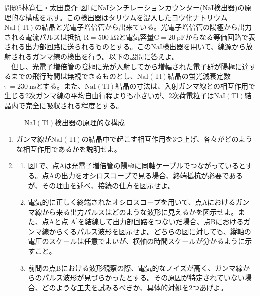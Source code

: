 \documentclass[fleqn]{jbook}
\begin{document}
\begin{question}{問題5}{林寛仁・太田良介}
図1に$\mathrm{NaI}$シンチレーションカウンター($\mathrm{NaI}$検出器)の原理的な構成を示す。この検出器はタリウムを混入したヨウ化ナトリウム$\mathrm{NaI(Tl)}$の結晶と光電子増倍管から出来ている。光電子増倍管の陽極から出力される電流パルスは抵抗
$\mathrm{R}=500 \ \mathrm{k\Omega}$と電気容量$\mathrm{C}=20 \ \mathrm{pF}$からなる等価回路で表される出力部回路に送られるものとする。この$\mathrm{NaI}$検出器を用いて、線源から放射されるガンマ線の検出を行う。以下の設問に答えよ。\\
　但し、光電子増倍管の陰極に光が入射してから増幅された電子群が陽極に達するまでの飛行時間は無視できるものとし、$\mathrm{NaI(Tl)}$結晶の蛍光減衰定数
$\mathrm{\tau}=230 \ \mathrm{ns}$とする。また、$\mathrm{NaI(Tl)}$結晶の寸法は、入射ガンマ線との相互作用で生じる2次ガンマ線の平均自由行程よりも小さいが、2次荷電粒子は$\mathrm{NaI(Tl)}$結晶内で完全に吸収される程度とする。
\begin{figure}[h]
  \begin{center}
    \caption{$\mathrm{NaI(Tl)}$検出器の原理的な構成}
  \end{center}
\end{figure}
\begin{enumerate}
\item ガンマ線が$\mathrm{NaI(Tl)}$の結晶中で起こす相互作用を3つ上げ、各々がどのような相互作用であるかを説明せよ。

\item 
\begin{enumerate}
	\item 図1で、点Aは光電子増倍管の陽極に同軸ケーブルでつながっているとする。点Aの出力をオシロスコープで見る場合、終端抵抗が必要であるが、その理由を述べ、接続の仕方を図示せよ。
	\item 電気的に正しく終端されたオシロスコープを用いて、点Aにおけるガンマ線から来る出力パルスはどのような波形に見えるかを図示せよ。また、点Aと点
	$\mathrm{A}^\prime$を結線して出力部回路をつないだ場合、点Bにおけるガンマ線からくるパルス波形を図示せよ。どちらの図に対しても、縦軸の電圧のスケールは任意でよいが、横軸の時間スケールが分かるように示すこと。
	\item 前問の点Bにおける波形観察の際、電気的なノイズが高く、ガンマ線からのパルス波形が見づらかったとする。その原因が特定されていない場合、どのような工夫を試みるべきか、具体的対処を2つあげよ。
\end{enumerate}


\end{enumerate}
\end{question}
\end{document}
